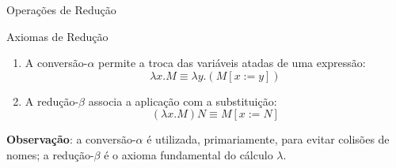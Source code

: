 \begin{frame}[fragile]{Operações de Redução}

    \begin{block}{Axiomas de Redução}
        \begin{enumerate}
            \item A conversão-$\alpha$ permite a troca das variáveis atadas de uma expressão:
            \[
                \lambda x.M \equiv \lambda y.(M[x:=y])
            \]

            \item A redução-$\beta$ associa a aplicação com a substituição:
            \[
                (\lambda x.M)N \equiv M[x:=N]
            \]
        \end{enumerate}
    \end{block}

    \vspace{0.1in}

    \textbf{Observação}: a conversão-$\alpha$ é utilizada, primariamente, para evitar colisões
        de nomes; a redução-$\beta$ é o axioma fundamental do cálculo $\lambda$.
\end{frame}
